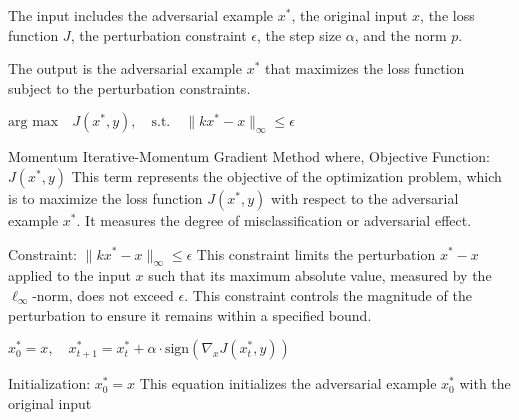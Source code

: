 The input includes the adversarial example $x^*$, the original input $x$, the loss function $J$, the perturbation constraint $\epsilon$, the step size $\alpha$, and the norm $p$.

The output is the adversarial example $x^*$ that maximizes the loss function subject to the perturbation constraints.

$\text{arg max} \quad J(x^*, y), \quad \text{s.t.} \quad \| kx^* - x \|_\infty \leq \epsilon$

Momentum Iterative-Momentum Gradient Method where, Objective Function:
$J(x^*, y)$
This term represents the objective of the optimization problem, which is to maximize the loss function $J(x^*, y)$ with respect to the adversarial example $x^*$. It measures the degree of misclassification or adversarial effect.

Constraint:
$\| kx^* - x \|_\infty \leq \epsilon$
 This constraint limits the perturbation $x^* - x$ applied to the input $x$ such that its maximum absolute value, measured by the $\ell_\infty$-norm, does not exceed $\epsilon$. This constraint controls the magnitude of the perturbation to ensure it remains within a specified bound.

$x^*_0 = x, \quad x^*_{t+1} = x^*_t + \alpha \cdot \text{sign} \left( \nabla_x J(x^*_t, y) \right)$

Initialization:
$x^*_0 = x$
This equation initializes the adversarial example $x^*_0$ with the original input
